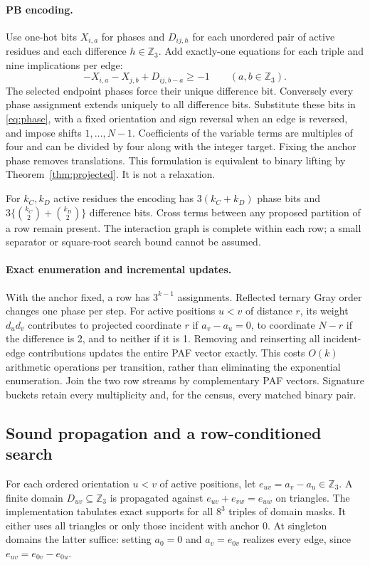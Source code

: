 \documentclass[11pt]{article}
\newcommand{\Z}{\mathbb Z}
\begin{document}
\paragraph{PB encoding.}
Use one-hot bits $X_{i,a}$ for phases and $D_{ij,h}$ for each unordered pair
of active residues and each difference $h\in\Z_3$. Add exactly-one equations
for each triple and nine implications per edge:
\[
 -X_{i,a}-X_{j,b}+D_{ij,b-a}\ge-1\qquad(a,b\in\Z_3).
\]
The selected endpoint phases force their unique difference bit. Conversely
every phase assignment extends uniquely to all difference bits. Substitute
these bits in \eqref{eq:phase}, with a fixed orientation and sign reversal
when an edge is reversed, and impose shifts $1,\ldots,N-1$. Coefficients of
the variable terms are multiples of four and can be divided by four along
with the integer target. Fixing the anchor phase removes translations.
This formulation is equivalent to binary lifting by
Theorem~\ref{thm:projected}. It is not a relaxation.

For $k_C,k_D$ active residues the encoding has $3(k_C+k_D)$ phase bits and
$3\{\binom{k_C}{2}+\binom{k_D}{2}\}$ difference bits. Cross terms between
any proposed partition of a row remain present. The interaction graph is
complete within each row; a small separator or square-root search bound
cannot be assumed.

\paragraph{Exact enumeration and incremental updates.}
With the anchor fixed, a row has $3^{k-1}$ assignments. Reflected ternary
Gray order changes one phase per step. For active positions $u<v$ of
distance $r$, its weight $d_ud_v$ contributes to projected coordinate $r$
if $a_v-a_u=0$, to coordinate $N-r$ if the difference is 2, and to neither
if it is 1. Removing and reinserting all incident-edge contributions updates
the entire PAF vector exactly. This costs $O(k)$ arithmetic operations per
transition, rather than eliminating the exponential enumeration.
Join the two row streams by complementary PAF vectors. Signature buckets
retain every multiplicity and, for the census, every matched binary pair.

\subsection{Sound propagation and a row-conditioned search}
For each ordered orientation $u<v$ of active positions, let
$e_{uv}=a_v-a_u\in\Z_3$. A finite domain $D_{uv}\subseteq\Z_3$ is
propagated against $e_{uv}+e_{vw}=e_{uw}$ on triangles. The implementation
tabulates exact supports for all $8^3$ triples of domain masks. It either
uses all triangles or only those incident with anchor 0. At singleton
domains the latter suffice: setting $a_0=0$ and $a_v=e_{0v}$ realizes every
edge, since $e_{uv}=e_{0v}-e_{0u}$.
\end{document}
